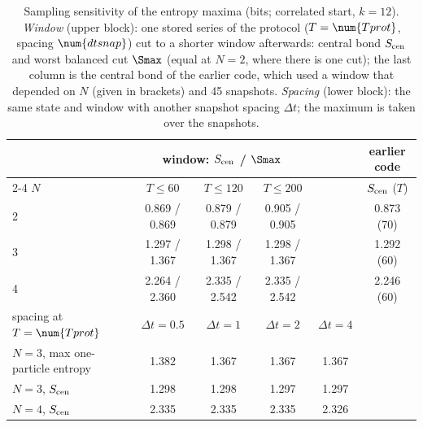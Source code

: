 \begin{table}[ht]
\centering
\small
\caption{Sampling sensitivity of the entropy maxima (bits; correlated start, $k=12$). \emph{Window} (upper block): one stored series of the protocol ($T=\num{Tprot}$, spacing $\num{dtsnap}$) cut to a shorter window afterwards: central bond $S_{\rm cen}$ and worst balanced cut $\Smax$ (equal at $N=2$, where there is one cut); the last column is the central bond of the earlier code, which used a window that depended on $N$ (given in brackets) and 45 snapshots. \emph{Spacing} (lower block): the same state and window with another snapshot spacing $\Delta t$; the maximum is taken over the snapshots.}
\label{tab:protocol}
\begin{tabular}{lccccc}
\toprule
 & \multicolumn{3}{c}{window: $S_{\rm cen}$ / $\Smax$} & & earlier code \\
\cmidrule(lr){2-4}
$N$ & $T\le60$ & $T\le120$ & $T\le200$ & & $S_{\rm cen}$ ($T$) \\
\midrule
2 & 0.869 / 0.869 & 0.879 / 0.879 & 0.905 / 0.905 & & 0.873 (70) \\
3 & 1.297 / 1.367 & 1.298 / 1.367 & 1.298 / 1.367 & & 1.292 (60) \\
4 & 2.264 / 2.360 & 2.335 / 2.542 & 2.335 / 2.542 & & 2.246 (60) \\
\midrule
spacing at $T=\num{Tprot}$ & $\Delta t=0.5$ & $\Delta t=1$ & $\Delta t=2$ & $\Delta t=4$ & \\
\midrule
$N=3$, max one-particle entropy & 1.382 & 1.367 & 1.367 & 1.367 & \\
$N=3$, $S_{\rm cen}$ & 1.298 & 1.298 & 1.297 & 1.297 & \\
$N=4$, $S_{\rm cen}$ & 2.335 & 2.335 & 2.335 & 2.326 & \\
\bottomrule
\end{tabular}
\end{table}
